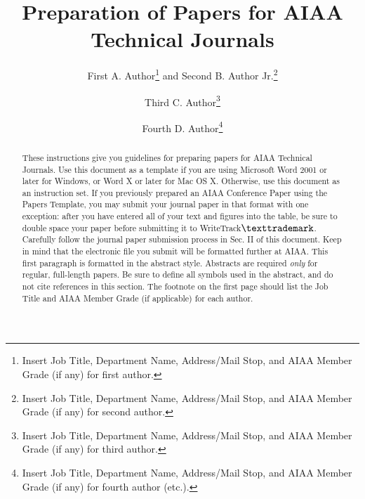 \documentclass{AIAA}
\begin{document}
\title{Preparation of Papers for AIAA Technical Journals}

\author{First A. Author\footnote{Insert Job Title, Department Name, Address/Mail Stop, and AIAA Member Grade (if any) for first author.} and Second B. Author Jr.\footnote{Insert Job Title, Department Name, Address/Mail Stop, and AIAA Member Grade (if any) for second author.}}
\author{Third C. Author\footnote{Insert Job Title, Department Name, Address/Mail Stop, and AIAA Member Grade (if any) for third author.}}
\author{Fourth D. Author\footnote{Insert Job Title, Department Name, Address/Mail Stop, and AIAA Member Grade (if any) for fourth author (etc.).}}

\begin{abstract}
These instructions give you guidelines for preparing papers for AIAA Technical Journals. Use this document as a template if you are using Microsoft Word 2001 or later for Windows, or Word X or later for Mac OS X. Otherwise, use this document as an instruction set. If you previously prepared an AIAA Conference Paper using the Papers Template, you may submit your journal paper in that format with one exception: after you have entered all of your text and figures into the table, be sure to double space your paper before submitting it to WriteTrack$\texttrademark $. Carefully follow the journal paper submission process in Sec. II of this document. Keep in mind that the electronic file you submit will be formatted further at AIAA. This first paragraph is formatted in the abstract style. Abstracts are required \textit{only} for regular, full-length papers. Be sure to define all symbols used in the abstract, and do not cite references in this section. The footnote on the first page should list the Job Title and AIAA Member Grade (if applicable) for each author.
\end{abstract}

\maketitle
\end{document}
